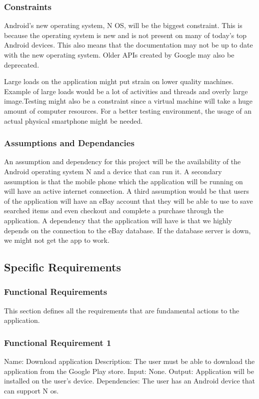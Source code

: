 \documentclass[journal,compsoc, 10pt, draftclsnofoot, onecolumn]{IEEEtran}
\begin{document}
\subsubsection{Constraints}

Android's new operating system, N OS, will be the biggest constraint. This is 
because the operating system is new and is not present on many of today's top 
Android devices. This also means that the documentation may not be up to date 
with the new operating system. Older APIs created by Google may also be
 deprecated.\newline

Large loads on the application might put strain on lower quality machines. 
Example of large loads would be a lot of activities and threads and overly 
large image.Testing might also be a constraint since a virtual machine will take a huge 
amount of computer resources. For a better testing environment, the usage of an 
actual physical smartphone might be needed.

\subsubsection{Assumptions and Dependancies}

An assumption and dependency for this project will be the availability of the 
Android operating system N and a device that can run it. A secondary assumption 
is that the mobile phone which the application will be running on will have an 
active internet connection. A third assumption would be that users of the 
application will have an eBay account that they will be able to use to save 
searched items and even checkout and complete a purchase through the 
application. A dependency that the application will have is that we highly 
depends on the connection to the eBay database. If the database server is down, 
we might not get the app to work.

\subsection{Specific Requirements}

\subsubsection{Functional Requirements}

This section defines all the requirements that are fundamental actions to the 
application.

\subsubsection*{Functional Requirement 1}
Name: Download application \newline
Description: The user must be able to download the application from the Google 
Play store. \newline
Input: None. \newline
Output: Application will be installed on the user's device. \newline
Dependencies: The user has an Android device that can support N os.
\end{document}

